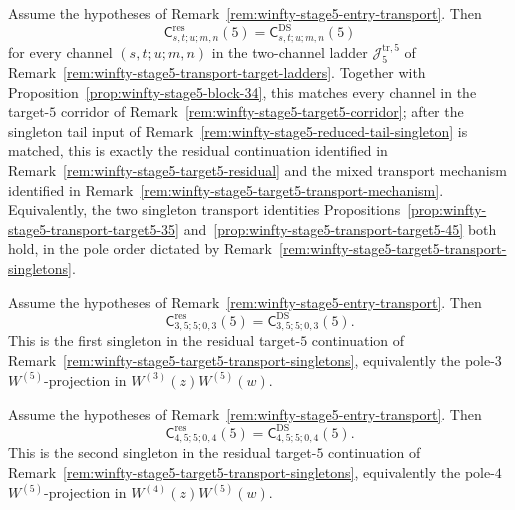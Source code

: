 \begin{proposition}
\label{prop:winfty-stage5-transport-target-5}
\ClaimStatusConditional{}
Assume the hypotheses of
Remark~\ref{rem:winfty-stage5-entry-transport}. Then
\[
\mathsf{C}^{\mathrm{res}}_{s,t;u;m,n}(5)
=
\mathsf{C}^{\mathrm{DS}}_{s,t;u;m,n}(5)
\]
for every channel $(s,t;u;m,n)$ in the two-channel ladder
$\mathcal{J}_5^{\mathrm{tr},5}$ of
Remark~\ref{rem:winfty-stage5-transport-target-ladders}. Together
with Proposition~\ref{prop:winfty-stage5-block-34}, this matches every
channel in the target-$5$ corridor of
Remark~\ref{rem:winfty-stage5-target5-corridor}; after the singleton
tail input of Remark~\ref{rem:winfty-stage5-reduced-tail-singleton}
is matched, this is exactly the residual continuation identified in
Remark~\ref{rem:winfty-stage5-target5-residual} and the mixed
transport mechanism identified in
Remark~\ref{rem:winfty-stage5-target5-transport-mechanism}.
Equivalently, the two singleton transport identities
Propositions~\ref{prop:winfty-stage5-transport-target5-35}
and~\ref{prop:winfty-stage5-transport-target5-45}
both hold, in the pole order dictated by
Remark~\ref{rem:winfty-stage5-target5-transport-singletons}.
\end{proposition}

\begin{proposition}
\label{prop:winfty-stage5-transport-target5-35}
\ClaimStatusProvedElsewhere{}
Assume the hypotheses of
Remark~\ref{rem:winfty-stage5-entry-transport}. Then
\[
\mathsf{C}^{\mathrm{res}}_{3,5;5;0,3}(5)
=
\mathsf{C}^{\mathrm{DS}}_{3,5;5;0,3}(5).
\]
This is the first singleton in the residual target-$5$ continuation of
Remark~\ref{rem:winfty-stage5-target5-transport-singletons},
equivalently the pole-$3$ $W^{(5)}$-projection in
$W^{(3)}(z)W^{(5)}(w)$.
\end{proposition}

\begin{proposition}
\label{prop:winfty-stage5-transport-target5-45}
\ClaimStatusProvedElsewhere{}
Assume the hypotheses of
Remark~\ref{rem:winfty-stage5-entry-transport}. Then
\[
\mathsf{C}^{\mathrm{res}}_{4,5;5;0,4}(5)
=
\mathsf{C}^{\mathrm{DS}}_{4,5;5;0,4}(5).
\]
This is the second singleton in the residual target-$5$ continuation of
Remark~\ref{rem:winfty-stage5-target5-transport-singletons},
equivalently the pole-$4$ $W^{(5)}$-projection in
$W^{(4)}(z)W^{(5)}(w)$.
\end{proposition}

